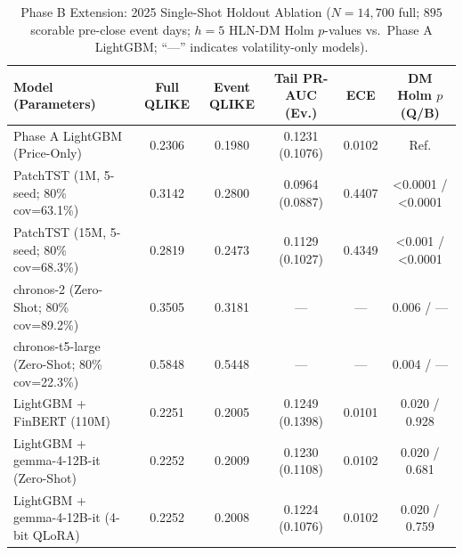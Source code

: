 \begin{table}[!t]
\centering
\caption{Phase B Extension: 2025 Single-Shot Holdout Ablation ($N=14{,}700$ full; $895$ scorable pre-close event days; $h=5$ HLN-DM Holm $p$-values vs.\ Phase A LightGBM; ``---'' indicates volatility-only models).}
\label{tab:phase_b_summary}
\scriptsize
\setlength{\tabcolsep}{3.5pt}
\begin{tabular}{lccccc}
\toprule
Model (Parameters) & Full QLIKE & Event QLIKE & Tail PR-AUC (Ev.) & ECE & DM Holm $p$ (Q/B) \\
\midrule
Phase A LightGBM (Price-Only) & 0.2306 & 0.1980 & 0.1231 (0.1076) & 0.0102 & Ref. \\
PatchTST (1M, 5-seed; 80\% cov=63.1\%) & 0.3142 & 0.2800 & 0.0964 (0.0887) & 0.4407 & <0.0001 / <0.0001 \\
PatchTST (15M, 5-seed; 80\% cov=68.3\%) & 0.2819 & 0.2473 & 0.1129 (0.1027) & 0.4349 & <0.001 / <0.0001 \\
chronos-2 (Zero-Shot; 80\% cov=89.2\%) & 0.3505 & 0.3181 & --- & --- & 0.006 / --- \\
chronos-t5-large (Zero-Shot; 80\% cov=22.3\%) & 0.5848 & 0.5448 & --- & --- & 0.004 / --- \\
LightGBM + FinBERT (110M) & 0.2251 & 0.2005 & 0.1249 (0.1398) & 0.0101 & 0.020 / 0.928 \\
LightGBM + gemma-4-12B-it (Zero-Shot) & 0.2252 & 0.2009 & 0.1230 (0.1108) & 0.0102 & 0.020 / 0.681 \\
LightGBM + gemma-4-12B-it (4-bit QLoRA) & 0.2252 & 0.2008 & 0.1224 (0.1076) & 0.0102 & 0.020 / 0.759 \\
\bottomrule
\end{tabular}
\end{table}
